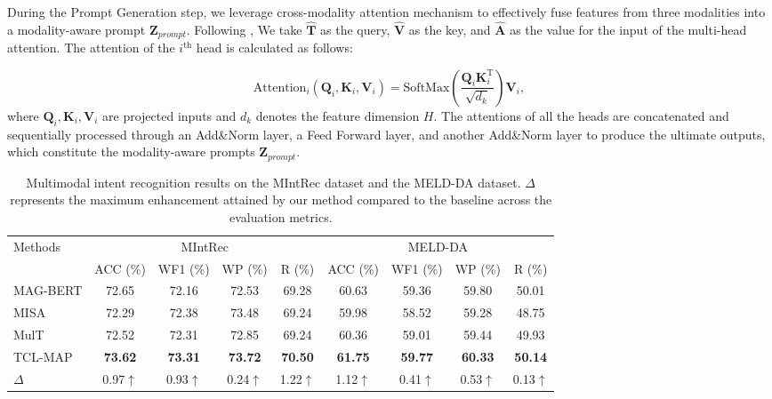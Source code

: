 \documentclass[letterpaper]{article} %
\begin{document}
During the Prompt Generation step, we leverage cross-modality attention mechanism to effectively fuse features from three modalities into a modality-aware prompt $\textbf{Z}_{prompt}$. Following \cite{tsai2019multimodal}, We take $\hat{\textbf{T}}$ as the query, $\hat{\textbf{V}}$ as the key, and $\hat{\textbf{A}}$ as the value for the input of the multi-head attention. The attention of the $i^{\text{th}}$ head is calculated as follows:

\begin{equation}
\text{Attention}_{i}(\textbf{Q}_{i}, \textbf{K}_{i}, \textbf{V}_{i}) = \text{SoftMax}(\frac{\textbf{Q}_{i}\textbf{K}_{i}^{\text{T}}}{\sqrt{d_{k}}})\textbf{V}_{i},
\end{equation}
where $\textbf{Q}_{i}, \textbf{K}_{i}, \textbf{V}_{i}$ are projected inputs and $d_{k}$ denotes the feature dimension $H$. The attentions of all the heads are concatenated and sequentially processed through an Add\&Norm layer, a Feed Forward layer, and another Add\&Norm layer to produce the ultimate outputs, which constitute the modality-aware prompts $\textbf{Z}_{prompt}$.


\begin{table*}[t!]
\centering
\begin{tabular}{@{\extracolsep{11pt}}l|cccc|cccc}
\toprule
\multirow{2}{*}{Methods}
& \multicolumn{4}{c|}{MIntRec}& \multicolumn{4}{c}{MELD-DA}\\

& ACC (\%) & WF1 (\%) & WP (\%) & R (\%) & ACC (\%) & WF1 (\%) & WP (\%) & R (\%) \\
\midrule
MAG-BERT & 72.65 & 72.16 & 72.53 & 69.28 & 60.63 & 59.36 & 59.80  & 50.01  \\

MISA & 72.29 & 72.38 & 73.48 & 69.24 & 59.98 & 58.52 & 59.28  & 48.75  \\

MulT & 72.52 & 72.31 & 72.85 & 69.24 & 60.36 & 59.01 & 59.44  & 49.93  \\

\midrule

TCL-MAP &
\textbf{73.62} &
\textbf{73.31} &
\textbf{73.72} &
\textbf{70.50} &
\textbf{61.75} &
\textbf{59.77} &
\textbf{60.33}  &
\textbf{50.14}  \\
$\Delta$ & 0.97$\uparrow$ & 0.93$\uparrow$ & 0.24$\uparrow$ &
1.22$\uparrow$ & 1.12$\uparrow$ & 0.41$\uparrow$ & 0.53$\uparrow$  & 0.13$\uparrow$ \\
\bottomrule
\end{tabular}
\caption{\protect \label{results}
Multimodal intent recognition results on the MIntRec dataset and the MELD-DA dataset. $\Delta$ represents the maximum enhancement attained by our method compared to the baseline across the evaluation metrics.}

\end{table*}
\end{document}
